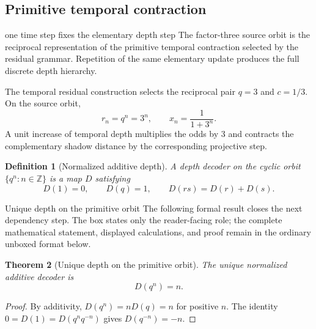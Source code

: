 \documentclass[11pt]{article}
\numberwithin{equation}{section}
\newtheorem{definition}{Definition}[section]
\newtheorem{theorem}[definition]{Theorem}
\theoremstyle{remark}
\begin{document}
\label{sec:depth}

\subsection{Primitive temporal contraction}
\begin{interpretivebridge}{one time step fixes the elementary depth step}
The factor-three source orbit is the reciprocal representation of the primitive temporal contraction selected by the residual grammar. Repetition of the same elementary update produces the full discrete depth hierarchy.
\end{interpretivebridge}

The temporal residual construction selects the reciprocal pair $q=3$ and $c=1/3$. On the source orbit,
\begin{equation}
 r_n=q^n=3^n,
\qquad
 x_n=\frac1{1+3^n}.
\end{equation}
A unit increase of temporal depth multiplies the odds by $3$ and contracts the complementary shadow distance by the corresponding projective step.

\begin{definition}[Normalized additive depth]
A depth decoder on the cyclic orbit $\{q^n:n\in\mathbb Z\}$ is a map $D$ satisfying
\begin{equation}
D(1)=0,
\qquad D(q)=1,
\qquad D(rs)=D(r)+D(s).
\end{equation}
\end{definition}

\begin{proofguide}{Unique depth on the primitive orbit}
The following formal result closes the next dependency step. The box states only the reader-facing role; the complete mathematical statement, displayed calculations, and proof remain in the ordinary unboxed format below.
\end{proofguide}
\begin{theorem}[Unique depth on the primitive orbit]
The unique normalized additive decoder is
\begin{equation}
D(q^n)=n.
\end{equation}
\end{theorem}
\begin{proof}
By additivity, $D(q^n)=nD(q)=n$ for positive $n$. The identity $0=D(1)=D(q^nq^{-n})$ gives $D(q^{-n})=-n$.
\end{proof}
\end{document}
